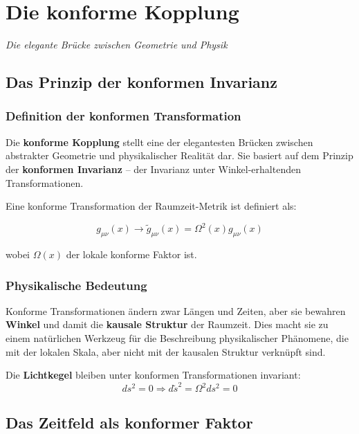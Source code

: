 \documentclass[12pt,a4paper]{report}
\begin{document}
% 
	\chapter{Die konforme Kopplung}
	\textit{Die elegante Brücke zwischen Geometrie und Physik}
	
	\section{Das Prinzip der konformen Invarianz}
	
	\subsection{Definition der konformen Transformation}
	
	Die \textbf{konforme Kopplung} stellt eine der elegantesten Brücken zwischen abstrakter Geometrie und physikalischer Realität dar. Sie basiert auf dem Prinzip der \textbf{konformen Invarianz} -- der Invarianz unter Winkel-erhaltenden Transformationen.
	
	Eine konforme Transformation der Raumzeit-Metrik ist definiert als:
	
	\begin{equation}
		g_{\mu\nu}(x) \to \tilde{g}_{\mu\nu}(x) = \Omega^2(x) g_{\mu\nu}(x)
	\end{equation}
	
	wobei $\Omega(x)$ der lokale konforme Faktor ist.
	
	\subsection{Physikalische Bedeutung}
	
	Konforme Transformationen ändern zwar Längen und Zeiten, aber sie bewahren \textbf{Winkel} und damit die \textbf{kausale Struktur} der Raumzeit. Dies macht sie zu einem natürlichen Werkzeug für die Beschreibung physikalischer Phänomene, die mit der lokalen Skala, aber nicht mit der kausalen Struktur verknüpft sind.
	
	Die \textbf{Lichtkegel} bleiben unter konformen Transformationen invariant:
	\begin{equation}
		ds^2 = 0 \Rightarrow d\tilde{s}^2 = \Omega^2 ds^2 = 0
	\end{equation}
	
	\section{Das Zeitfeld als konformer Faktor}
	
\end{document}
